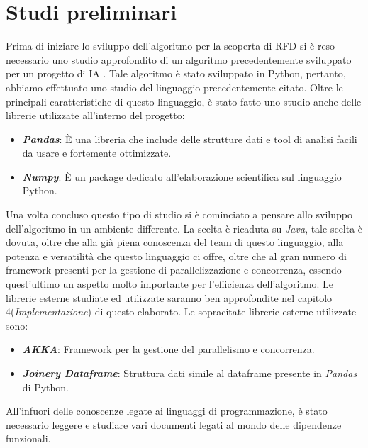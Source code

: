 \section{Studi preliminari}
Prima di iniziare lo sviluppo dell'algoritmo per la scoperta di RFD si è reso necessario uno studio approfondito di un algoritmo precedentemente sviluppato per un progetto di IA \cite{tesinaIA}.
Tale algoritmo è stato sviluppato in Python, pertanto, abbiamo effettuato uno studio del linguaggio precedentemente citato.
Oltre le principali caratteristiche di questo linguaggio, è stato fatto uno studio anche delle librerie utilizzate all'interno del progetto:
\begin{itemize}
	\item \textbf{\emph{Pandas}}: È una libreria che include delle strutture dati e tool di analisi facili da usare e fortemente ottimizzate. 
	\item \textbf{\emph{Numpy}}: È un package dedicato all'elaborazione scientifica sul linguaggio Python.
\end{itemize}
Una volta concluso questo tipo di studio si è cominciato a pensare allo sviluppo dell'algoritmo in un ambiente differente.
La scelta è ricaduta su \emph{Java}, tale scelta è dovuta, oltre che alla già piena conoscenza del team di questo linguaggio, alla potenza e versatilità che questo linguaggio ci offre, oltre che al gran numero di framework presenti per la gestione di parallelizzazione e concorrenza, essendo quest'ultimo un aspetto molto importante per l'efficienza dell'algoritmo.
Le librerie esterne studiate ed utilizzate saranno ben approfondite nel capitolo 4(\emph{Implementazione}) di questo elaborato.
Le sopracitate librerie esterne utilizzate sono:
\begin{itemize}
	\item \textbf{\emph{AKKA}}: Framework per la gestione del parallelismo e concorrenza.
	\item \textbf{\emph{Joinery Dataframe}}: Struttura dati simile al dataframe presente in \emph{Pandas} di Python.
\end{itemize}
All'infuori delle conoscenze legate ai linguaggi di programmazione, è stato necessario leggere e studiare vari documenti legati al mondo delle dipendenze funzionali. 
